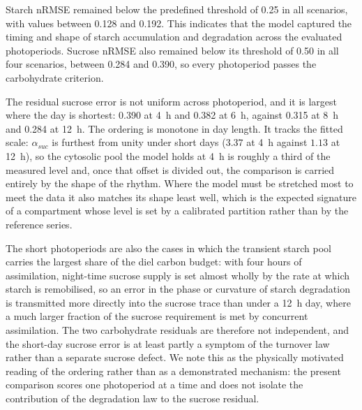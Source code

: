 \documentclass[a4paper,fleqn]{cas-sc}
\begin{document}
Starch nRMSE remained below the predefined threshold of 0.25 in all scenarios,
with values between 0.128 and 0.192. This indicates that the model captured the
timing and shape of starch accumulation and degradation across the evaluated
photoperiods. Sucrose nRMSE also remained below its threshold of 0.50 in all
four scenarios, between 0.284 and 0.390, so every photoperiod passes the
carbohydrate criterion.

The residual sucrose error is not uniform across photoperiod, and it is
largest where the day is shortest: 0.390 at 4~h and 0.382 at 6~h, against
0.315 at 8~h and 0.284 at 12~h. The ordering is monotone in day length. It
tracks the fitted scale: $\alpha_{suc}$ is furthest from unity under short
days ($3.37$ at 4~h against $1.13$ at 12~h), so the cytosolic pool the model
holds at 4~h is roughly a third of the measured level and, once that offset is
divided out, the comparison is carried entirely by the shape of the rhythm.
Where the model must be stretched most to meet the data it also matches its
shape least well, which is the expected signature of a compartment whose level
is set by a calibrated partition rather than by the reference series.

The short photoperiods are also the cases in which the transient starch pool
carries the largest share of the diel carbon budget: with four hours of
assimilation, night-time sucrose supply is set almost wholly by the rate at
which starch is remobilised, so an error in the phase or curvature of starch
degradation is transmitted more directly into the sucrose trace than under a
12~h day, where a much larger fraction of the sucrose requirement is met by
concurrent assimilation. The two carbohydrate residuals are therefore not
independent, and the short-day sucrose error is at least partly a symptom of
the turnover law rather than a separate sucrose defect. We note this as the
physically motivated reading of the ordering rather than as a demonstrated
mechanism: the present comparison scores one photoperiod at a time and does
not isolate the contribution of the degradation law to the sucrose residual.
\end{document}
